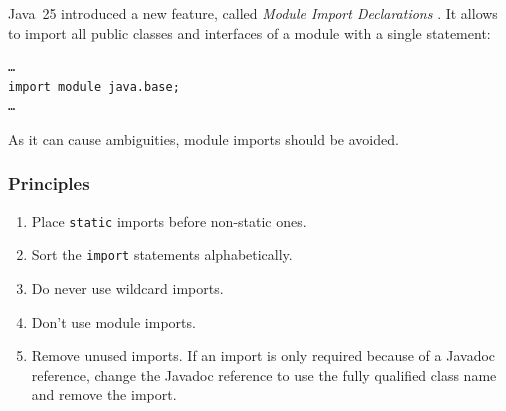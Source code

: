 Java~25 introduced a new feature, called \textit{Module Import Declarations} \autocite{JEP511}. It allows to import all public classes and interfaces of a module with a single statement:
\begin{lstlisting}
…
import module java.base;
…
\end{lstlisting}
As it can cause ambiguities, module imports should be avoided.

\subsubsection{Principles}
\begin{enumerate}[label=P\arabic*.]
	\item{Place \lstinline|static| imports before non-static ones.}
	
	\item{Sort the \lstinline|import| statements alphabetically.}
	
	\item{Do never use wildcard imports.}
	
	\item{Don't use module imports.}
	
	\item{Remove unused imports. If an import is only required because of a Javadoc reference, change the Javadoc reference to use the fully qualified class name and remove the import.}
\end{enumerate}


